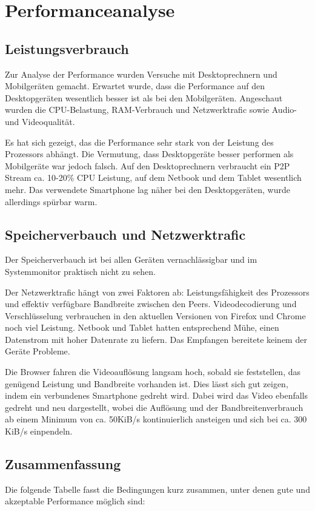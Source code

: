 \chapter{Performanceanalyse}
	\section{Leistungsverbrauch}
		Zur Analyse der Performance wurden Versuche mit Desktoprechnern und Mobilgeräten gemacht. Erwartet wurde, dass die Performance auf den Desktopgeräten wesentlich besser ist als bei den Mobilgeräten.
		Angeschaut wurden die CPU-Belastung, RAM-Verbrauch und Netzwerktrafic sowie Audio- und Videoqualität.
		
		Es hat sich gezeigt, das die Performance sehr stark von der Leistung des Prozessors abhängt. Die Vermutung, dass Desktopgeräte besser performen als Mobilgeräte war jedoch falsch. 
		Auf den Desktoprechnern verbraucht ein P2P Stream ca. 10-20\% CPU Leistung, auf dem Netbook und dem Tablet wesentlich mehr. Das verwendete Smartphone lag näher bei den Desktopgeräten, wurde allerdings spürbar warm.	
		
		
	\section{Speicherverbauch und Netzwerktrafic}
		Der Speicherverbauch ist bei allen Geräten vernachlässigbar und im Systemmonitor praktisch nicht zu sehen.
		
		Der Netzwerktrafic hängt von zwei Faktoren ab: Leistungsfähigkeit des Prozessors und effektiv verfügbare Bandbreite zwischen den Peers.
		Videodecodierung und Verschlüsselung verbrauchen in den aktuellen Versionen von Firefox und Chrome noch viel Leistung. Netbook und Tablet hatten entsprechend Mühe, einen Datenstrom mit hoher Datenrate zu liefern. Das Empfangen bereitete keinem der Geräte Probleme.
		
		Die Browser fahren die Videoauflösung langsam hoch, sobald sie feststellen, das genügend Leistung und Bandbreite vorhanden ist. Dies lässt sich gut zeigen, indem ein verbundenes Smartphone gedreht wird. Dabei wird das Video ebenfalls gedreht und neu dargestellt, wobei die Auflösung und der Bandbreitenverbrauch ab einem Minimum von ca. 50KiB/s kontinuierlich ansteigen und sich bei ca. 300 KiB/s einpendeln.
	
	
	\section{Zusammenfassung}
		Die folgende Tabelle fasst die Bedingungen kurz zusammen, unter denen gute und akzeptable Performance möglich sind:

